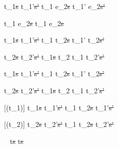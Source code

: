  {t_1\st{s}  t_1'\st{s'}}
  {t_1 \Next e_2\st{s}  t_1' \Next e_2\st{s'}}

  { }
  {t_1 \Next e_2\st{s} \handle{\Continue} t_1 \Then e_2\st{s}}


  {t_1\st{s}  t_1'\st{s'} }
  {t_1 \And t_2\st{s}  t_1' \And t_2\st{s'}}

  {t_2\st{s}  t_2'\st{s'} }
  {t_1\st{s} \And t_2  t_1 \And t_2'\st{s'}}


  {t_1\st{s}  t_1'\st{s'} }
  {t_1 \Or t_2\st{s}  t_1' \Or t_2\st{s'}}

  {t_2\st{s}  t_2'\st{s'} }
  {t_1\st{s} \Or t_2  t_1 \Or t_2'\st{s'}}


[\Succeeding(t_1)]
  {t_1\st{s}  t_1'\st{s'}}
  {t_1 \Xor t_2\st{s}  t_1'\st{s'}}

[\Succeeding(t_2)]
  {t_2\st{s}  t_2'\st{s'}}
  {t_1 \Xor t_2\st{s}  t_2'\st{s'}}

  {\ }
  {t\st{s} \handle{\Pick \Here} t\st{s}}











